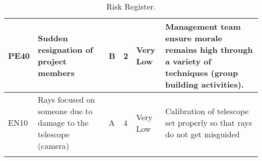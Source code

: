 \begin{longtable}{|m{}| m{} |m{} |m{}|m{}| m{}|}
PE40 & Sudden resignation of project members								& B & 2 & \cellcolor[HTML]{34FF34}Very Low	& Management team ensure morale remains high through a variety of techniques (group building activities).\\\hline


EN10 & Rays focused on someone due to damage to the telescope (camera)		& A & 4 & \cellcolor[HTML]{34FF34}Very Low	& Calibration of telescope set properly so that rays do not get misguided\\\hline


\caption{Risk Register.}
\label{tab:risk-register}
\end{longtable}
\raggedbottom